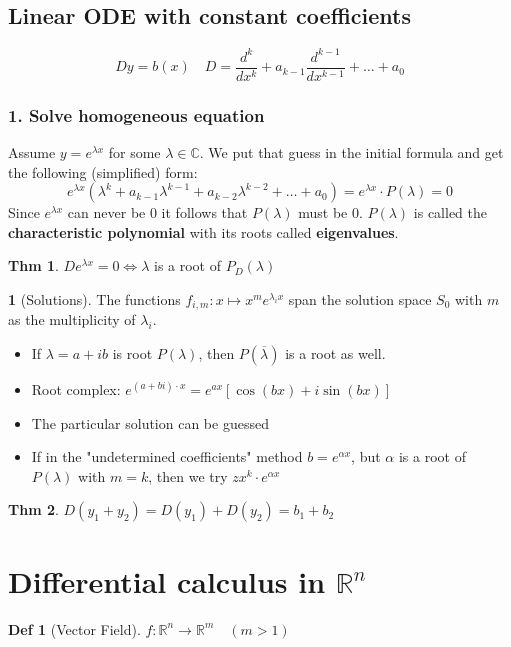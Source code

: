 \documentclass[a4paper, 10pt]{article}
\theoremstyle{definition}
\newtheorem*{theorem}{Thm}
\newtheorem*{definition}{Def}
\theoremstyle{colored}
\newtheorem*{note_wrapper}{}
\theoremstyle{ex}
\theoremstyle{named}
\newenvironment{note}%
    {\begin{mdframed}[style=trick]\begin{note_wrapper}}%
    {\end{note_wrapper}\end{mdframed}}
\newcommand{\R}{\mathbb{R}}
\newcommand{\C}{\mathbb{C}}
\begin{document}
\subsection{Linear ODE with constant coefficients}
\[Dy = b(x) \quad D = \frac{d^k}{dx^k} + a_{k - 1} \frac{d^{k-1}}{dx^{k-1}} + \ldots + a_0\]

\subsubsection*{1. Solve homogeneous equation}
Assume \(y = e^{\lambda x}\) for some \(\lambda \in \C\). We put that guess in the initial formula and get the following (simplified) form:
\[e^{\lambda x}(\lambda^k + a_{k-1}\lambda^{k-1} + a_{k-2}\lambda^{k-2} + \ldots + a_0) = e^{\lambda x} \cdot P(\lambda) = 0\]
Since \(e^{\lambda x}\) can never be \(0\) it follows that \(P(\lambda)\) must be \(0\). \(P(\lambda)\) is called the \textbf{characteristic polynomial} with its roots called \textbf{eigenvalues}.

\begin{theorem}
    \(D e^{\lambda x} = 0 \iff \lambda\) is a root of \(P_D(\lambda)\)
\end{theorem}

\begin{note}[Solutions]
    The functions \(f_{i, m}: x \mapsto x^m e^{\lambda_i x}\) span the solution space \(S_0\) with \(m\) as the multiplicity of \(\lambda_i\).

    \begin{itemize}
        \item If \(\lambda = a + ib\) is root \(P(\lambda)\), then \(P(\overline{\lambda})\) is a root as well.
        \item Root complex: \(e^{(a + bi) \cdot x} = e^{ax}[\cos(bx) + i \sin(bx)]\)
        \item The particular solution can be guessed
        \item If in the "undetermined coefficients" method \(b = e^{\alpha x}\), but \(\alpha\) is a root of \(P(\lambda)\) with \(m = k\), then we try \(zx^k \cdot e^{\alpha x}\)
    \end{itemize}
\end{note}

\begin{theorem}
    \(D(y_1 + y_2) = D(y_1) + D(y_2) = b_1 + b_2\)
\end{theorem}

\section{Differential calculus in \(\R^n\)}
\begin{definition}[Vector Field]
    \(f: \R^n \to \R^m \quad (m > 1)\)
\end{definition}
\end{document}
